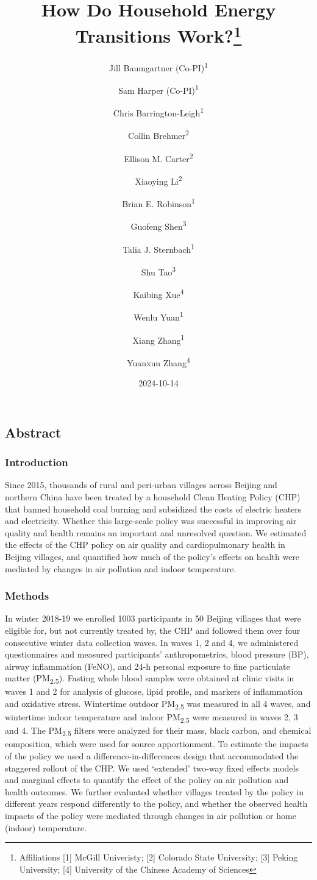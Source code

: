 \documentclass[
  letterpaper,
  DIV=11,
  numbers=noendperiod]{scrartcl}
\title{How Do Household Energy Transitions Work?\thanks{Affiliations
{[}1{]} McGill Univeristy; {[}2{]} Colorado State University; {[}3{]}
Peking University; {[}4{]} University of the Chinese Academy of
Sciences}}
\author{Jill Baumgartner (Co-PI)\textsuperscript{1} \and Sam Harper
(Co-PI)\textsuperscript{1} \and Chris
Barrington-Leigh\textsuperscript{1} \and Collin
Brehmer\textsuperscript{2} \and Ellison M.
Carter\textsuperscript{2} \and Xiaoying Li\textsuperscript{2} \and Brian
E. Robinson\textsuperscript{1} \and Guofeng
Shen\textsuperscript{3} \and Talia J.
Sternbach\textsuperscript{1} \and Shu
Tao\textsuperscript{3} \and Kaibing Xue\textsuperscript{4} \and Wenlu
Yuan\textsuperscript{1} \and Xiang Zhang\textsuperscript{1} \and Yuanxun
Zhang\textsuperscript{4}}
\date{2024-10-14}
\renewcommand*\contentsname{Table of contents}
\newcommand\contentsname{Table of contents}
\begin{document}
\maketitle

\renewcommand*\contentsname{Table of contents}
{
\hypersetup{linkcolor=}
\setcounter{tocdepth}{3}
\tableofcontents
}

\subsection*{Abstract}\label{abstract}

\subsubsection*{Introduction}\label{introduction}

Since 2015, thousands of rural and peri-urban villages across Beijing
and northern China have been treated by a household Clean Heating Policy
(CHP) that banned household coal burning and subsidized the costs of
electric heaters and electricity. Whether this large-scale policy was
successful in improving air quality and health remains an important and
unresolved question. We estimated the effects of the CHP policy on air
quality and cardiopulmonary health in Beijing villages, and quantified
how much of the policy's effects on health were mediated by changes in
air pollution and indoor temperature.

\subsubsection*{Methods}\label{methods}

In winter 2018-19 we enrolled 1003 participants in 50 Beijing villages
that were eligible for, but not currently treated by, the CHP and
followed them over four consecutive winter data collection waves. In
waves 1, 2 and 4, we administered questionnaires and measured
participants' anthropometrics, blood pressure (BP), airway inflammation
(FeNO), and 24-h personal exposure to fine particulate matter
(PM\textsubscript{2.5}). Fasting whole blood samples were obtained at
clinic visits in waves 1 and 2 for analysis of glucose, lipid profile,
and markers of inflammation and oxidative stress. Wintertime outdoor
PM\textsubscript{2.5} was measured in all 4 waves, and wintertime indoor
temperature and indoor PM\textsubscript{2.5} were measured in waves 2, 3
and 4. The PM\textsubscript{2.5} filters were analyzed for their mass,
black carbon, and chemical composition, which were used for source
apportionment. To estimate the impacts of the policy we used a
difference-in-differences design that accommodated the staggered rollout
of the CHP. We used `extended' two-way fixed effects models and marginal
effects to quantify the effect of the policy on air pollution and health
outcomes. We further evaluated whether villages treated by the policy in
different years respond differently to the policy, and whether the
observed health impacts of the policy were mediated through changes in
air pollution or home (indoor) temperature.
\end{document}
